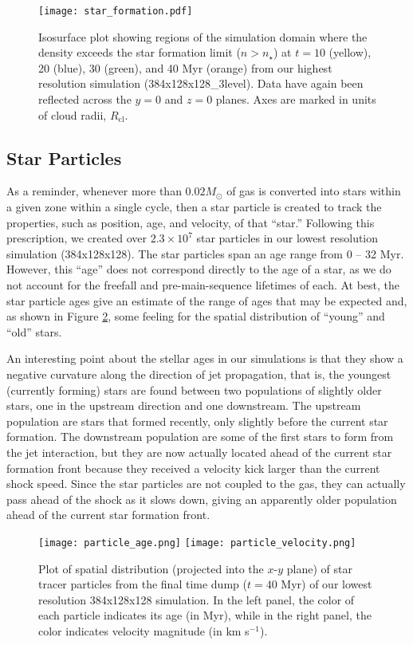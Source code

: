 \documentclass{aastex6}
\begin{document}
\begin{figure}
\texttt{[image: star\_formation.pdf]} 
\caption{Isosurface plot showing regions of the simulation domain where the density exceeds the star formation limit ($n > n_\star$) at $t = 10$ (yellow), 20 (blue), 30 (green), and 40 Myr (orange) from our highest resolution simulation (384x128x128\_3level). Data have again been reflected across the $y=0$ and $z=0$ planes. Axes are marked in units of cloud radii, $R_\mathrm{cl}$. 
\label{fig:formation}}
\end{figure}


\subsection{Star Particles}
\label{sec:star_particles}

As a reminder, whenever more than $0.02 M_\odot$ of gas is converted into stars within a given zone within a single cycle, then a star particle is created to track the properties, such as position, age, and velocity, of that ``star.''  Following this prescription, we created over $2.3 \times 10^7$ star particles in our lowest resolution simulation (384x128x128).  The star particles span an age range from 0 -- 32 Myr. However, this ``age'' does not correspond directly to the age of a star, as we do not account for the freefall and pre-main-sequence lifetimes of each. At best, the star particle ages give an estimate of the range of ages that may be expected and, as shown in Figure \ref{fig:stars}, some feeling for the spatial distribution of ``young'' and ``old'' stars.

An interesting point about the stellar ages in our simulations is that they show a negative curvature along the direction of jet propagation, that is, the youngest (currently forming) stars are found between two populations of slightly older stars, one in the upstream direction and one downstream. The upstream population are stars that formed recently, only slightly before the current star formation.  The downstream population are some of the first stars to form from the jet interaction, but they are now actually located ahead of the current star formation front because they received a velocity kick larger than the current shock speed.  Since the star particles are not coupled to the gas, they can actually pass ahead of the shock as it slows down, giving an apparently older population ahead of the current star formation front.  

\begin{figure}
\texttt{[image: particle\_age.png]} 
\texttt{[image: particle\_velocity.png]} 
\caption{Plot of spatial distribution (projected into the $x$-$y$ plane) of star tracer particles from the final time dump ($t=40$ Myr) of our lowest resolution 384x128x128 simulation.  In the left panel, the color of each particle indicates its age (in Myr), while in the right panel, the color indicates velocity magnitude (in km s$^{-1}$). 
\label{fig:stars}}
\end{figure}
\end{document}
